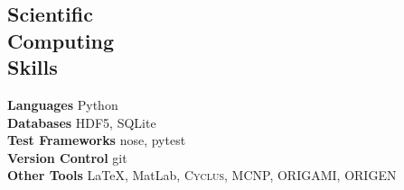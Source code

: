 \documentclass[margin,line]{resume}
\newcommand{\Cyclus}{\textsc{Cyclus}\xspace}%
\begin{document}
\begin{resume}
    

    \section{\mysidestyle Scientific\\Computing\\Skills}
        \textbf{Languages} \hfill Python\vspace{.5mm}\\%
        \textbf{Databases} \hfill HDF5, SQLite\vspace{.5mm}\\%
        \textbf{Test Frameworks} \hfill nose, pytest\vspace{.5mm}\\%
        \textbf{Version Control} \hfill git\vspace{.5mm}\\%
        \textbf{Other Tools} \hfill \LaTeX, MatLab, \Cyclus, MCNP, ORIGAMI, ORIGEN\vspace{.5mm}%

\end{resume}
\end{document}
